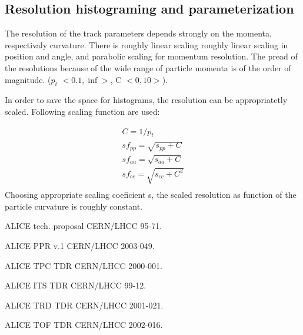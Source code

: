 \documentclass{elsart}
\begin{document}
\subsection{Resolution histograming and parameterization}

The resolution of the track parameters depends strongly on the momenta, 
respectivaly curvature. 
There is roughly linear scaling roughly linear scaling in position and 
angle, and parabolic scaling  for momentum resolution. The pread of the resolutions
because of the wide range of particle momenta is of the order of magnitude.
($p_t$ $<0.1,\inf>$, C $<0,10>$).

In order to save the space for histograms, the resolution can be appropriatetly 
scaled. Following scaling function are used:

\begin{equation}
\begin{split}
C=1/p_t \\
sf_{pp} =   \sqrt{s_{pp}+C}   \\
sf_{aa} =   \sqrt{s_{aa}+C}   \\
sf_{cc} =   \sqrt{s_{cc}+C^2} \\ 
\end{split}
\end{equation}
Choosing appropriate scaling coeficient s, the scaled resolution as function of the
particle curvature is roughly constant.  





\begin{thebibliography}{9}   %

ALICE tech. proposal CERN/LHCC 95-71.

ALICE PPR v.1 CERN/LHCC 2003-049.

ALICE TPC TDR CERN/LHCC 2000-001.

ALICE ITS TDR CERN/LHCC 99-12.

ALICE TRD TDR CERN/LHCC 2001-021.

ALICE TOF TDR CERN/LHCC 2002-016.


\end{thebibliography}
\end{document}
